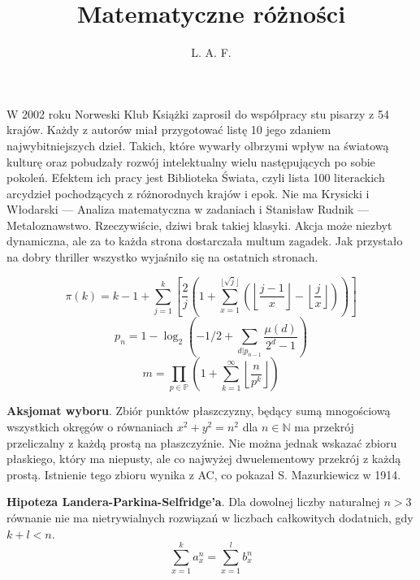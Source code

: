 \begin{parnumbers}


\usepackage{Alegreya}
\usepackage{microtype}

\usepackage[polish]{babel}
\usepackage[utf8]{inputenc}
\usepackage[T1]{fontenc}

\author{L. A. F.}
\title{Matematyczne różności}

 
\maketitle

W 2002 roku Norweski Klub Książki zaprosił do współpracy stu pisarzy z 54 krajów. Każdy z autorów miał przygotować listę 10 jego zdaniem najwybitniejszych dzieł. Takich, które wywarły olbrzymi wpływ na światową kulturę oraz pobudzały rozwój intelektualny wielu następujących po sobie pokoleń. Efektem ich pracy jest Biblioteka Świata, czyli lista 100 literackich arcydzieł pochodzących z różnorodnych krajów i epok. Nie ma Krysicki i Włodarski --- Analiza matematyczna w zadaniach i Stanisław Rudnik --- Metaloznawstwo. Rzeczywiście, dziwi brak takiej klasyki. Akcja może niezbyt dynamiczna, ale za to każda strona dostarczała multum zagadek. Jak przystało na dobry thriller wszystko wyjaśniło się na ostatnich stronach.

\[\pi(k) = k - 1 + \sum_{j=1}^k \left[\frac{2}{j}\left(1+\sum_{x = 1}^{\lfloor \sqrt{j}\rfloor} \left(\left\lfloor\frac{j-1}{x}\right\rfloor - \left\lfloor\frac{j}{x}\right\rfloor\right)\right)\right]\]
\[p_n = 1 - \log_2 \left(-1/2 + \sum_{d|p_{n-1}} \frac{\mu (d)}{2^d - 1}\right)\]
\[m = \prod_{p\in\mathbb P} \left(1+\sum_{k=1}^\infty \left\lfloor\frac{n}{p^k}\right\rfloor\right)\]

\textbf{Aksjomat wyboru}. Zbiór punktów płaszczyzny, będący sumą mnogościową wszystkich okręgów o równaniach $x^2 + y^2 = n^2$ dla $n \in \mathbb{N}$ ma przekrój przeliczalny z każdą prostą na płaszczyźnie. Nie można jednak wskazać zbioru płaskiego, który ma niepusty, ale co najwyżej dwuelementowy przekrój z każdą prostą. Istnienie tego zbioru wynika z AC, co pokazał S. Mazurkiewicz w 1914.

\textbf{Hipoteza Landera-Parkina-Selfridge'a}. Dla dowolnej liczby naturalnej $n > 3$ równanie nie ma nietrywialnych rozwiązań w liczbach całkowitych dodatnich, gdy $k+l < n$.
\[\sum_{x=1}^k a_x^n = \sum_{x=1}^l b_x^n\]


\end{parnumbers}
